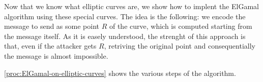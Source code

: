 \documentclass{subfiles}
\begin{document}
    Now that we know what elliptic curves are, 
        we show how to implent the ElGamal algorithm using these special curves.
        The idea is the following: we encode the message to send as some point \(R\) of 
        the curve, which is computed starting from the message itself.
        As it is easely understood, the strenght of this approach is that,
        even if the attacker gets \(R\), retriving the original point and consequentially the message
        is almost impossible.

    \autoref{proc:ElGamal-on-elliptic-curves} shows the various steps of the algorithm.
        
\end{document}
